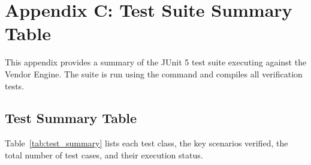 
\section{Appendix C: Test Suite Summary Table}
\label{sec:appendix_test_summary}

This appendix provides a summary of the JUnit 5 test suite executing against the Vendor Engine. The suite is run using the command  and compiles all verification tests.

\subsection{Test Summary Table}
Table~\ref{tab:test_summary} lists each test class, the key scenarios verified, the total number of test cases, and their execution status.

